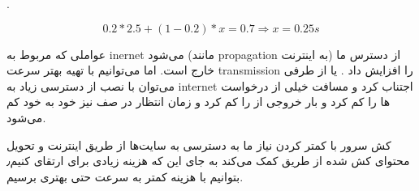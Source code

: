 \problem{}
.

\subproblem{}
\begin{equation*}
	0.2 * 2.5 + (1-0.2)* x = 0.7 
	\Rightarrow x = 0.25 \unit{s}
\end{equation*}

\subproblem{}

\subproblem{}
عواملی که مربوط به 
inernet 
می‌شود
(مانند 
propagation 
به اینترنت)
 از دسترس ما خارج است.
 اما می‌توانیم با تهیه
 بهتر سرعت 
 transmission
را افزایش داد
.
یا از طرفی می‌توان با نصب 
از دسترسی زیاد به 
internet 
اجتناب کرد و مسافت خیلی از درخواست ها را کم کرد و بار خروجی از 
را کم کرد
و زمان انتظار در صف نیز خود به خود کم می‌شود.  

\subproblem{}
کش‌ سرور با کمتر کردن نیاز ما به دسترسی به سایت‌ها از طریق اینترنت و تحویل محتوای کش شده از طریق 
کمک می‌کند به جای این که هزینه زیادی برای ارتقای
کنیم٫ 
بتوانیم با هزینه کمتر به سرعت حتی بهتری برسیم.
 
 
 
 